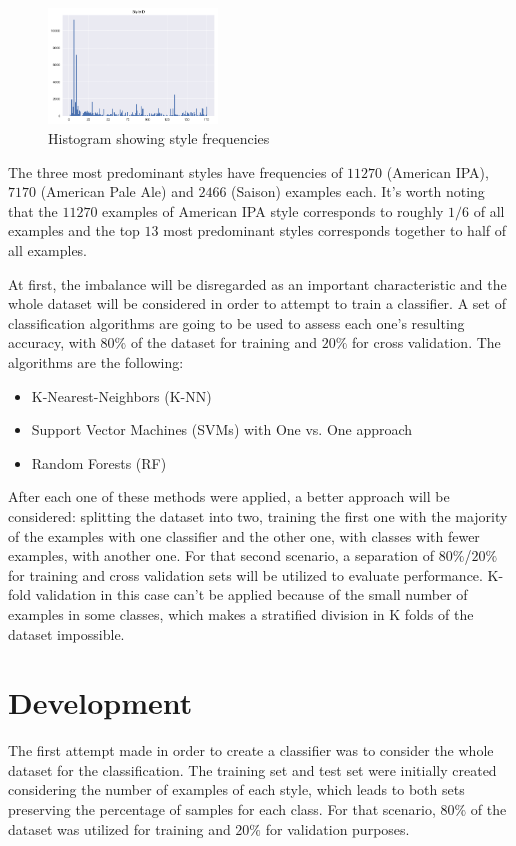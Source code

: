 \documentclass[10pt,twocolumn,letterpaper]{article}
\begin{document}
\begin{figure}[H]
\begin{center}
	\includegraphics[width=0.4\textwidth]{pics/style_hist}
	\caption{Histogram showing style frequencies\label{fig:style_hist}}   
\end{center} 
\end{figure}   

The three most predominant styles have frequencies of $11270$ (American IPA), $7170$ (American Pale Ale) and $2466$ (Saison) examples each. It's worth noting that the $11270$ examples of American IPA style corresponds to roughly $1/6$ of all examples and the top $13$ most predominant styles corresponds together to half of all examples.

At first, the imbalance will be disregarded as an important characteristic and the whole dataset will be considered in order to attempt to train a classifier. A set of classification algorithms are going to be used to assess each one's resulting accuracy, with $80\%$ of the dataset for training and $20\%$ for cross validation. The algorithms are the following:

\begin{itemize}
	\item K-Nearest-Neighbors (K-NN)
	\item Support Vector Machines (SVMs) with One vs. One approach
	\item Random Forests (RF)
\end{itemize}

After each one of these methods were applied, a better approach will be considered: splitting the dataset into two, training the first one with the majority of the examples with one classifier and the other one, with classes with fewer examples, with another one. For that second scenario, a separation of $80\%$/$20\%$ for training and cross validation sets will be utilized to evaluate performance. K-fold validation in this case can't be applied because of the small number of examples in some classes, which makes a stratified division in K folds of the dataset impossible.

\section{Development}
The first attempt made in order to create a classifier was to consider the whole dataset for the classification. The training set and test set were initially created considering the number of examples of each style, which leads to both sets preserving the percentage of samples for each class. For that scenario, $80\%$ of the dataset was utilized for training and $20\%$ for validation purposes.
\end{document}
